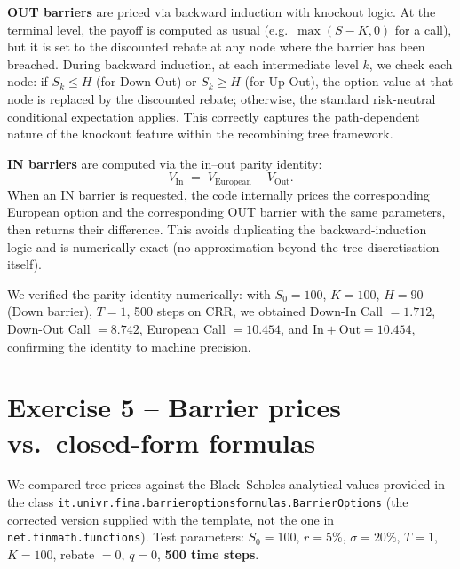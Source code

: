 \documentclass[11pt,a4paper]{article}
\begin{document}
\textbf{OUT barriers} are priced via backward induction with knockout logic. At the terminal level, the payoff is computed as usual (e.g.\ $\max(S-K, 0)$ for a call), but it is set to the discounted rebate at any node where the barrier has been breached. During backward induction, at each intermediate level $k$, we check each node: if $S_k \leq H$ (for Down-Out) or $S_k \geq H$ (for Up-Out), the option value at that node is replaced by the discounted rebate; otherwise, the standard risk-neutral conditional expectation applies. This correctly captures the path-dependent nature of the knockout feature within the recombining tree framework.

\textbf{IN barriers} are computed via the in--out parity identity:
\[
  V_{\text{In}} \;=\; V_{\text{European}} - V_{\text{Out}}.
\]
When an IN barrier is requested, the code internally prices the corresponding European option and the corresponding OUT barrier with the same parameters, then returns their difference. This avoids duplicating the backward-induction logic and is numerically exact (no approximation beyond the tree discretisation itself).

We verified the parity identity numerically: with $S_0\!=\!100$, $K\!=\!100$, $H\!=\!90$ (Down barrier), $T\!=\!1$, 500 steps on CRR, we obtained Down-In Call $= 1.712$, Down-Out Call $= 8.742$, European Call $= 10.454$, and $\text{In} + \text{Out} = 10.454$, confirming the identity to machine precision.

\section{Exercise 5 -- Barrier prices vs.\ closed-form formulas}

We compared tree prices against the Black--Scholes analytical values provided in the class \texttt{it.univr.fima.barrieroptionsformulas.BarrierOptions} (the corrected version supplied with the template, not the one in \texttt{net.finmath.functions}).  Test parameters: $S_0\!=\!100$, $r\!=\!5\%$, $\sigma\!=\!20\%$, $T\!=\!1$, $K\!=\!100$, rebate $=0$, $q=0$, \textbf{500 time steps}.
\end{document}
